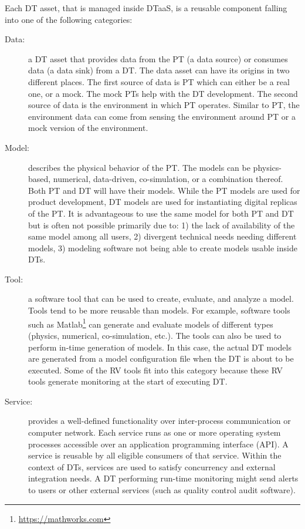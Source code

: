 Each DT asset, that is managed inside DTaaS, is a reusable component falling into one of the following categories:
\begin{description}
	\item[Data:] a DT asset that provides data from the PT (a data source) or consumes data (a data sink) from a DT. The data asset can have its origins in two different places. The first source of data is PT which can either be a real one, or a mock. The mock PTs help with the DT development. The second source of data is the environment in which PT operates. Similar to PT, the environment data can come from sensing the environment around PT or a mock version of the environment.
	\item[Model:] describes the physical behavior of the PT. The models can be physics-based, numerical, data-driven, co-simulation, or a combination thereof. Both PT and DT will have their models. While the PT models are used for product development, DT models are used for instantiating digital replicas of the PT. It is advantageous to use the same model for both PT and DT but is often not possible primarily due to: 1) the lack of availability of the same model among all users, 2) divergent technical needs needing different models, 3) modeling software not being able to create models usable inside DTs.
	\item[Tool:] a software tool that can be used to create, evaluate, and analyze a model. Tools tend to be more reusable than models. For example, software tools such as Matlab\footnote{\url{https://mathworks.com}} can generate and evaluate models of different types (physics, numerical, co-simulation, etc.). The tools can also be used to perform in-time generation of models. In this case, the actual DT models are generated from a model configuration file when the DT is about to be executed. Some of the RV tools fit into this category because these RV tools generate monitoring at the start of executing DT.
	\item[Service:] provides a well-defined functionality over inter-process communication or computer network. Each service runs as one or more operating system processes accessible over an application programming interface (API). A service is reusable by all eligible consumers of that service. Within the context of DTs, services are used to satisfy concurrency and external integration needs. A DT performing run-time monitoring might send alerts to users or other external services (such as quality control audit software).
\end{description}%
